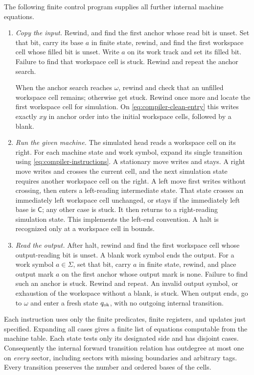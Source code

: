 The following finite control program supplies all further internal
machine equations.
\begin{enumerate}
\item \emph{Copy the input.} Rewind, and find the first anchor whose read
  bit is unset. Set that bit, carry its base $a$ in finite state, rewind,
  and find the first workspace cell whose filled bit is unset. Write
  $a$ on its work track and set its filled bit. Failure to find that
  workspace cell is stuck. Rewind and repeat the anchor search.

  When the anchor search reaches $\omega$, rewind and check that an
  unfilled workspace cell remains; otherwise get stuck. Rewind once
  more and locate the first workspace cell for simulation. On
  \eqref{eq:compiler-clean-entry} this writes exactly $xy$ in anchor
  order into the initial workspace cells, followed by a blank.

\item \emph{Run the given machine.} The simulated head reads a workspace
  cell on its right. For each machine state and work symbol, expand its
  single transition using \eqref{eq:compiler-instructions}. A stationary
  move writes and stays. A right move writes and crosses the current
  cell, and the next simulation state requires another workspace cell
  on the right. A left move first writes without crossing, then enters
  a left-reading intermediate state. That state crosses an immediately
  left workspace cell unchanged, or stays if the immediately left base
  is $\mathsf C$; any other case is stuck. It then returns to a
  right-reading simulation state. This implements the left-end
  convention. A halt is recognized only at a workspace cell in bounds.

\item \emph{Read the output.} After halt, rewind and find the first
  workspace cell whose output-reading bit is unset. A blank work symbol
  ends the output. For a work symbol $a\in\Sigma$, set that bit, carry
  $a$ in finite state, rewind, and place output mark $a$ on the first
  anchor whose output mark is none. Failure to find such an anchor is
  stuck. Rewind and repeat. An invalid output symbol, or exhaustion of
  the workspace without a blank, is stuck. When output ends, go to
  $\omega$ and enter a fresh state $q_{\rm ok}$, with no outgoing
  internal transition.
\end{enumerate}

Each instruction uses only the finite predicates, finite registers, and
updates just specified. Expanding all cases gives a finite list of
equations computable from the machine table. Each state tests only its
designated side and has disjoint cases. Consequently the internal
forward transition relation has outdegree at most one on \emph{every}
sector, including sectors with missing boundaries and arbitrary tags.
Every transition preserves the number and ordered bases of the cells.

